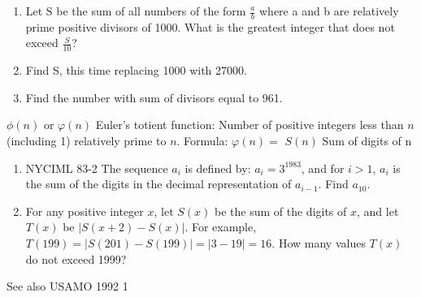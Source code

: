 \documentclass{article}
\begin{document}
\begin{enumerate}
\item Let S be the sum of all numbers of the form $\frac{a}{b}$ where a and b are relatively prime positive divisors of 1000. What is the greatest integer that does not exceed $\frac{S}{10}$? 
\item Find S, this time replacing 1000 with 27000.
\item Find the number with sum of divisors equal to 961.
\end{enumerate}


$\phi (n)$ or $\varphi (n)$ Euler's totient function: Number of positive integers less than $n$ (including 1) relatively prime to $n$.
\newline
\newline
Formula: $\varphi (n)=$
\newline
\newline
$S(n)$ Sum of digits of n
\begin{enumerate}
\item NYCIML 83-2 The sequence $a_i$ is defined by: $a_i=3^{1983}$, and for $i>1$, $a_{i}$ is the sum of the digits in the decimal representation of $a_{i-1}$. Find $a_{10}$.
\item For any positive integer $x$, let $S(x)$ be the sum of the digits of $x$, and let $T(x)$ be $|S(x+2)-S(x)|$. For example, $T(199) = |S(201) - S(199)| = |3 - 19| = 16$. How many values $T(x)$ do not exceed 1999?
\end{enumerate}
See also USAMO 1992 1
%
%
%
%
%
%
%
%
%
\end{document}
